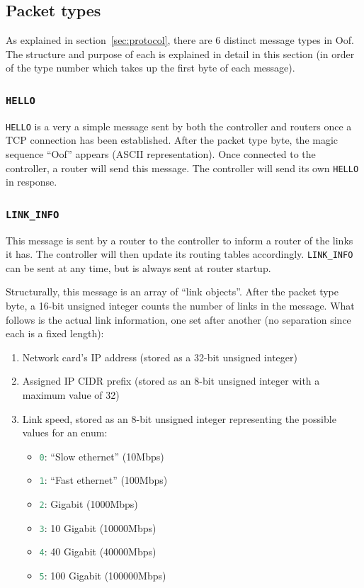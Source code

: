 \documentclass[a4paper]{article}
\numberwithin{figure}{section}
\numberwithin{table}{section}
\newcommand{\mi}{\mintinline}
\begin{document}
\newpage
\subsection{Packet types}
As explained in section~\ref{sec:protocol}, there are 6 distinct message types in Oof. The structure and purpose of each is explained in detail in this section (in order of the type number which takes up the first byte of each message).

\subsubsection{\mi{c}{HELLO}}
\mi{c}{HELLO} is a very a simple message sent by both the controller and routers once a TCP connection has been established. After the packet type byte, the magic sequence ``Oof'' appears (ASCII representation). Once connected to the controller, a router will send this message. The controller will send its own \mi{c}{HELLO} in response.

\subsubsection{\mi{c}{LINK_INFO}}
This message is sent by a router to the controller to inform a router of the links it has. The controller will then update its routing tables accordingly. \mi{c}{LINK_INFO} can be sent at any time, but is always sent at router startup.

Structurally, this message is an array of ``link objects''. After the packet type byte, a 16-bit unsigned integer counts the number of links in the message. What follows is the actual link information, one set after another (no separation since each is a fixed length):
\begin{enumerate}
	\item Network card's IP address (stored as a 32-bit unsigned integer)
	\item Assigned IP CIDR prefix (stored as an 8-bit unsigned integer with a maximum value of 32)
	\item Link speed, stored as an 8-bit unsigned integer representing the possible values for an enum:
		\begin{itemize}
			\item \mi{c}{0}: ``Slow ethernet'' (10Mbps)
			\item \mi{c}{1}: ``Fast ethernet'' (100Mbps)
			\item \mi{c}{2}: Gigabit (1000Mbps)
			\item \mi{c}{3}: 10 Gigabit (10000Mbps)
			\item \mi{c}{4}: 40 Gigabit (40000Mbps)
			\item \mi{c}{5}: 100 Gigabit (100000Mbps)
		\end{itemize}
\end{enumerate}
\end{document}
